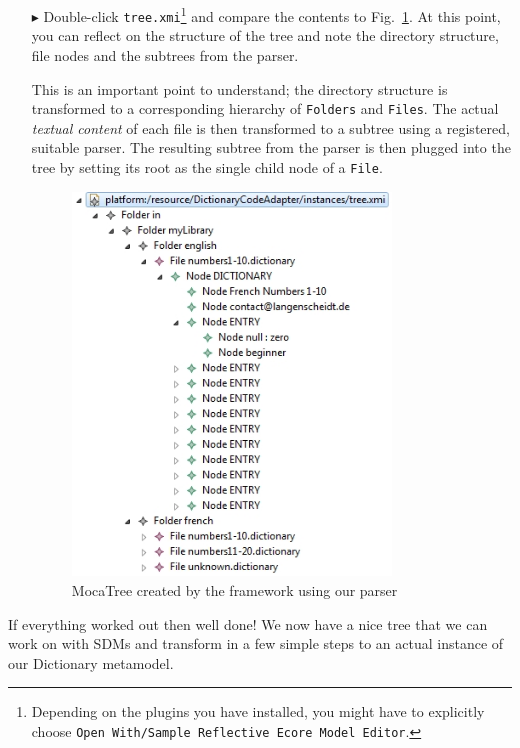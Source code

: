 \begin{enumerate}
  \item[$\blacktriangleright$] Double-click \texttt{tree.xmi}\footnote{Depending on the plugins you have installed, you might have to explicitly choose \texttt{Open With/Sample Reflective Ecore Model Editor}.} and compare the contents to Fig.~\ref{fig:moca-10-ParseResult2}. At this point, you can reflect on the structure of the tree and note the directory structure, file nodes and the subtrees from the parser.
  
This is an important point to understand; the directory structure is transformed to a corresponding hierarchy of \texttt{Folders} and \texttt{Files}.
The actual \emph{textual content} of each file is then transformed to a subtree using a registered, suitable parser.
The resulting subtree from the parser is then plugged into the tree by setting its root as the single child node of a \texttt{File}.
\begin{figure}[!htbp]
\begin{center}
 \includegraphics[width=0.8\textwidth]{pics/moca/2TextToMocaTree/10-ParseResult2}
  \caption{MocaTree created by the framework using our parser}
  \label{fig:moca-10-ParseResult2}
\end{center}
\end{figure}
\end{enumerate}

If everything worked out then well done!  We now have a nice tree that we can work on with SDMs and transform in a few simple steps to an actual instance of our Dictionary metamodel.